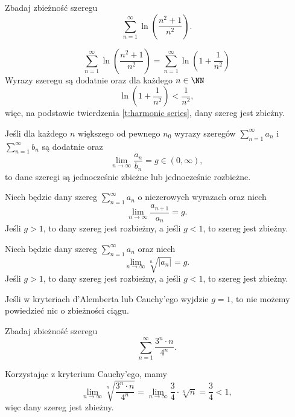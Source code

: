 \begin{example}
    Zbadaj zbieżność szeregu
    \[ \sum_{n=1}^\infty \ln\left(\frac{n^2 + 1}{n^2}\right). \]
\end{example}
\begin{solution}
    \[ \sum_{n=1}^\infty \ln\left(\frac{n^2 + 1}{n^2}\right) = \sum_{n=1}^\infty \ln\left(1 + \frac{1}{n^2}\right) \]
    Wyrazy szeregu są dodatnie oraz dla każdego $n \in \NN$
    \[ \ln\left(1 + \frac{1}{n^2}\right)  < \frac{1}{n^2}, \]
    więc, na podstawie twierdzenia \ref{t:harmonic series}, dany szereg jest zbieżny.
\end{solution}

\begin{theorem}
    Jeśli dla każdego $n$ większego od pewnego $n_0$ wyrazy szeregów $\sum_{n=1}^\infty a_n$ i $\sum_{n=1}^\infty b_n$ są dodatnie oraz
    \[ \lim_{n\to\infty} \frac{a_n}{b_n} = g \in (0, \infty), \]
    to dane szeregi są jednocześnie zbieżne lub jednocześnie rozbieżne.
\end{theorem}

\begin{theorem}
    Niech będzie dany szereg $\sum_{n=1}^\infty a_n$ o niezerowych wyrazach oraz niech
    \[ \lim_{n\to\infty} \frac{a_{n+1}}{a_n} = g. \]
    Jeśli $g > 1$, to dany szereg jest rozbieżny, a jeśli $g < 1$, to szereg jest zbieżny.
\end{theorem}

\begin{theorem}
    Niech będzie dany szereg $\sum_{n=1}^\infty a_n$ oraz niech
    \[ \lim_{n\to\infty} \sqrt[n]{|a_n|} = g. \]
    Jeśli $g > 1$, to dany szereg jest rozbieżny, a jeśli $g < 1$, to szereg jest zbieżny.
\end{theorem}

\begin{remark*}
    Jeśli w kryteriach d'Alemberta lub Cauchy'ego wyjdzie $g = 1$, to nie możemy powiedzieć nic o zbieżności ciągu.
\end{remark*}

\begin{example}
    Zbadaj zbieżność szeregu
    \[ \sum_{n=1}^\infty \frac{3^n \cdot n}{4^n}. \]
\end{example}
\begin{solution}
    Korzystając z kryterium Cauchy'ego, mamy
    \[ \lim_{n\to\infty} \sqrt[n]{\frac{3^n \cdot n}{4^n}} = \lim_{n\to\infty} \frac{3}{4} \cdot \sqrt[n]{n} = \frac{3}{4} < 1, \]
    więc dany szereg jest zbieżny.
\end{solution}

